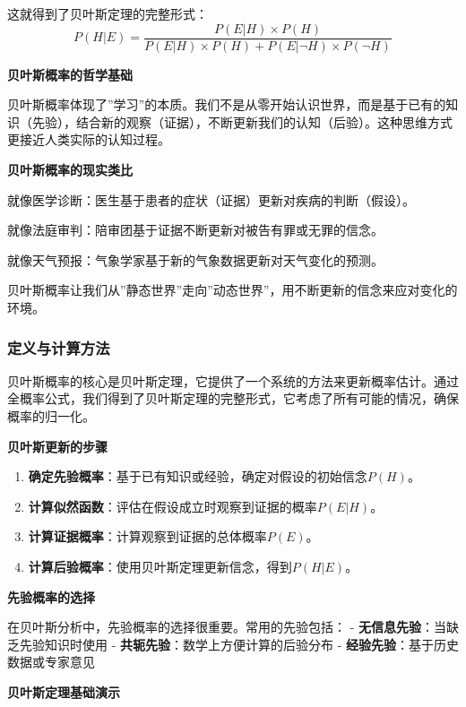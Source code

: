 \documentclass[
]{book}
\begin{document}
这就得到了贝叶斯定理的完整形式：
\[P(H|E) = \frac{P(E|H) \times P(H)}{P(E|H) \times P(H) + P(E|\neg H) \times P(\neg H)}\]

\textbf{贝叶斯概率的哲学基础}

贝叶斯概率体现了''学习''的本质。我们不是从零开始认识世界，而是基于已有的知识（先验），结合新的观察（证据），不断更新我们的认知（后验）。这种思维方式更接近人类实际的认知过程。

\textbf{贝叶斯概率的现实类比}

就像医学诊断：医生基于患者的症状（证据）更新对疾病的判断（假设）。

就像法庭审判：陪审团基于证据不断更新对被告有罪或无罪的信念。

就像天气预报：气象学家基于新的气象数据更新对天气变化的预测。

贝叶斯概率让我们从''静态世界''走向''动态世界''，用不断更新的信念来应对变化的环境。

\hypertarget{ux5b9aux4e49ux4e0eux8ba1ux7b97ux65b9ux6cd5-1}{%
\subsubsection{定义与计算方法}\label{ux5b9aux4e49ux4e0eux8ba1ux7b97ux65b9ux6cd5-1}}

贝叶斯概率的核心是贝叶斯定理，它提供了一个系统的方法来更新概率估计。通过全概率公式，我们得到了贝叶斯定理的完整形式，它考虑了所有可能的情况，确保概率的归一化。

\textbf{贝叶斯更新的步骤}

\begin{enumerate}
\def\labelenumi{\arabic{enumi}.}
\item
  \textbf{确定先验概率}：基于已有知识或经验，确定对假设的初始信念\(P(H)\)。
\item
  \textbf{计算似然函数}：评估在假设成立时观察到证据的概率\(P(E|H)\)。
\item
  \textbf{计算证据概率}：计算观察到证据的总体概率\(P(E)\)。
\item
  \textbf{计算后验概率}：使用贝叶斯定理更新信念，得到\(P(H|E)\)。
\end{enumerate}

\textbf{先验概率的选择}

在贝叶斯分析中，先验概率的选择很重要。常用的先验包括：
- \textbf{无信息先验}：当缺乏先验知识时使用
- \textbf{共轭先验}：数学上方便计算的后验分布
- \textbf{经验先验}：基于历史数据或专家意见

\textbf{贝叶斯定理基础演示}
\end{document}
